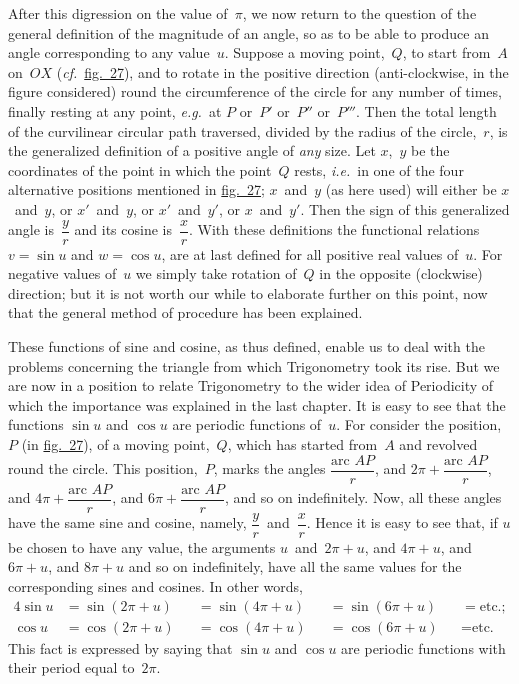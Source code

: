 \documentclass[12pt,leqno]{book}[2005/09/16]
\newcommand{\Typo}[2]{#2}
\newcommand{\Chg}[2]{#2}
\newcommand{\Fig}[2][Fig.]{\hyperref[fig:#2]{#1~#2}}
\newcommand{\PageSep}[1]{\ignorespaces}
\newcommand{\cf}{\emph{cf.}}
\newcommand{\eg}{\emph{e.g.}}
\newcommand{\ie}{\emph{i.e.}}
\begin{document}
After this digression on the value of~$\pi$, we
now return to the question of the general
definition of the magnitude of an angle, so as
to be able to produce an angle corresponding
to any value~$u$. Suppose a moving point,~$Q$,
to start from~$A$ on~$OX$ (\Chg{cf.}{\cf}\ \Fig[fig.]{27}), and to rotate
in the positive direction (anti-clockwise, in
the figure considered) round the circumference
of the circle for any number of times, finally
resting at any point, \eg~at $P$ or~$P'$ or~$P''$ or~$P'''$.
Then the total length of the curvilinear
circular path traversed, divided by the radius
of the circle,~$r$, is the generalized definition of
a positive angle of \emph{any} size. Let $x$,~$y$ be the
coordinates of the point in which the point~$Q$
rests, \ie~in one of the four alternative positions
mentioned in \Fig[fig.]{27}; $x$~and~$y$ (as here used) will
either \Typo{}{be} $x$~and~$y$, or $x'$~and~$y$, or $x'$~and~$y'$, or $x$~and~$y'$.
\PageSep{188}
Then the sign of this generalized
angle is~$\dfrac{y}{r}$ and its cosine is~$\dfrac{x}{r}$. With these
definitions the functional relations $v = \sin u$
and $w = \cos u$, are at last defined for all positive
real values of~$u$. For negative values of~$u$
we simply take rotation of~$Q$ in the opposite
(clockwise) direction; but it is not worth our
while to elaborate further on this point, now
that the general method of procedure has
been explained.

These functions of sine and cosine, as thus
defined, enable us to deal with the problems
concerning the triangle from which Trigonometry
took its rise. But we are now in a
position to relate Trigonometry to the wider
idea of Periodicity of which the importance
%
was explained in the last chapter. It is easy
to see that the functions $\sin u$ and $\cos u$ are
periodic functions of~$u$. For consider the
position,~$P$ (in \Fig[fig.]{27}), of a moving point,~$Q$,
which has started from~$A$ and revolved round
the circle. This position,~$P$, marks the angles
$\dfrac{\text{arc } AP}{r}$, and $2\pi + \dfrac{\text{arc } AP}{r}$, and $4\pi + \dfrac{\text{arc } AP}{r}$,
and $6\pi + \dfrac{\text{arc } AP}{r}$, and so on indefinitely. Now,
all these angles have the same sine and cosine,
namely, $\dfrac{y}{r}$~and~$\dfrac{x}{r}$. Hence it is easy to see that,
\PageSep{189}
%
if $u$ be chosen to have any value, the arguments
$u$~and~$2\pi + u$, and $4\pi + u$, and $6\pi + u$,
and $8\pi + u$ and so on indefinitely, have all the
same values for the corresponding sines and
cosines. In other words,
\begin{alignat*}{4}
\sin u &= \sin(2\pi + u) &&= \sin(4\pi + u) &&= \sin(6\pi + u) &&= \text{etc.}; \\
\cos u &= \cos(2\pi + u) &&= \cos(4\pi + u) &&= \cos(6\pi + u) &&= \text{etc.}
\end{alignat*}
This fact is expressed by saying that $\sin u$ and
$\cos u$ are periodic functions with their period
equal to~$2\pi$.
\end{document}
